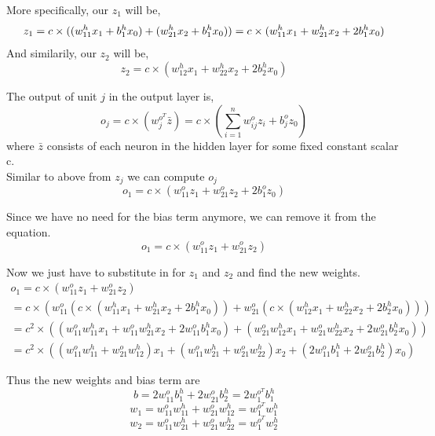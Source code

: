 \documentclass{article}
\begin{document}
More specifically, our $z_1$ will be,
\begin{equation*}
  z_1=c\times((w_{11}^hx_1+b_1^hx_0)+(w_{21}^hx_2+b_1^hx_0)) \\
  =c\times(w_{11}^hx_1+w_{21}^hx_2+2b_1^hx_0)
\end{equation*}
And similarily, our $z_2$ will be,
\begin{equation*}
  z_2=c\times(w_{12}^hx_1+w_{22}^hx_2+2b_2^hx_0)
\end{equation*}

The output of unit $j$ in the output layer is,
\begin{equation*}
  o_j=c\times(w_j^{o^T}\bar{z})=c\times(\sum_{i=1}^{n}w_{ij}^oz_i+
  b_{j}^oz_0)
\end{equation*}
where $\bar{z}$ consists of each neuron in the hidden layer
for some fixed constant scalar c. \\

Similar to above from $z_j$ we can compute $o_j$
\begin{equation*}
  o_1=c\times(w_{11}^oz_1+w_{21}^oz_2+2b_1^oz_0)
\end{equation*}

Since we have no need for the bias term anymore, we
can remove it from the equation.
\begin{equation*}
  o_1=c\times(w_{11}^oz_1+w_{21}^oz_2)
\end{equation*}

Now we just have to substitute in for $z_1$ and $z_2$
and find the new weights.
\begin{multline*}
  o_1=c\times(w_{11}^oz_1+w_{21}^oz_2) \\
  =c\times(w_{11}^o(c\times(w_{11}^hx_1+w_{21}^hx_2+2b_1^hx_0))+
  w_{21}^o(c\times(w_{12}^hx_1+w_{22}^hx_2+2b_2^hx_0))) \\
  =c^2\times((w_{11}^ow_{11}^hx_1+w_{11}^ow_{21}^hx_2+2w_{11}^ob_1^hx_0)+
  (w_{21}^ow_{12}^hx_1+w_{21}^ow_{22}^hx_2+2w_{21}^ob_2^hx_0)) \\
  =c^2\times((w_{11}^ow_{11}^h+w_{21}^ow_{12}^h)x_1+
  (w_{11}^ow_{21}^h+w_{21}^ow_{22}^h)x_2+(2w_{11}^ob_1^h+2w_{21}^ob_2^h)x_0)
\end{multline*}

Thus the new weights and bias term are
\begin{equation*}
  b=2w_{11}^ob_1^h+2w_{21}^ob_2^h=2w_1^{o^T}b_1^h
\end{equation*}
\begin{equation*}
  w_1=w_{11}^ow_{11}^h+w_{21}^ow_{12}^h=w_1^{o^T}w_1^h
\end{equation*}
\begin{equation*}
  w_2=w_{11}^ow_{21}^h+w_{21}^ow_{22}^h=w_1^{o^T}w_2^h
\end{equation*}
\end{document}
